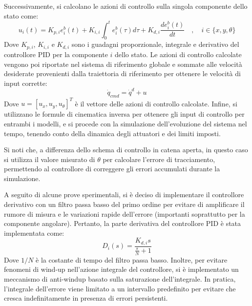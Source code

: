Successivamente, si calcolano le azioni di controllo sulla singola componente dello stato come:
\begin{equation}\label{eq:pid_control_law}
    u_i(t) = K_{p,i} e_i^b(t) + K_{i,i} \int_0^t e_i^b(\tau) d\tau + K_{d,i} \frac{d e_i^b(t)}{dt} \quad , \quad i \in \{x,y,\theta\}
\end{equation}
Dove $K_{p,i}$, $K_{i,i}$ e $K_{d,i}$ sono i guadagni proporzionale, integrale e derivativo del controllore PID per la componente $i$ dello stato. Le azioni di controllo calcolate vengono poi riportate nel sistema di riferimento globale e sommate alle velocità desiderate provenienti dalla traiettoria di riferimento per ottenere le velocità di input corrette:
\begin{equation}\label{eq:corrected_desired_state}
    \dot{q}_{cmd} = \dot{q}^d + u
\end{equation}
Dove $u = [u_x, u_y, u_\theta]^T$ è il vettore delle azioni di controllo calcolate. Infine, si utilizzano le formule di cinematica inversa per ottenere gli input di controllo per entrambi i modelli, e si procede con la simulazione dell'evoluzione del sistema nel tempo, tenendo conto della dinamica degli attuatori e dei limiti imposti.
\begin{note}
    Si noti che, a differenza dello schema di controllo in catena aperta, in questo caso si utilizza il valore misurato di $\theta$ per calcolare l'errore di tracciamento, permettendo al controllore di correggere gli errori accumulati durante la simulazione.
\end{note}

A seguito di alcune prove sperimentali, si è deciso di implementare il controllore derivativo con un filtro passa basso del primo ordine per evitare di amplificare il rumore di misura e le variazioni rapide dell'errore (importanti soprattutto per la componente angolare). Pertanto, la parte derivativa del controllore PID è stata implementata come:
\begin{equation}\label{eq:filtered_derivative}
    D_i(s) = \frac{K_{d,i} s}{\frac{s}{N} + 1}
\end{equation}
Dove $1/N$ è la costante di tempo del filtro passa basso.
Inoltre, per evitare fenomeni di wind-up nell'azione integrale del controllore, si è implementato un meccanismo di anti-windup basato sulla saturazione dell'integrale. In pratica, l'integrale dell'errore viene limitato a un intervallo predefinito per evitare che cresca indefinitamente in presenza di errori persistenti.

